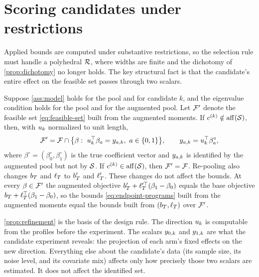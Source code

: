 \section{Scoring candidates under restrictions}
\label{sec:selection}

Applied bounds are computed under substantive restrictions, so the selection rule must handle a polyhedral $\mathcal R$, where widths
are finite and the dichotomy of \cref{prop:dichotomy} no longer holds. The
key structural fact is that the candidate's entire effect on the
feasible set passes through two scalars.

\begin{proposition}
\label{prop:refinement}
Suppose \cref{ass:model} holds for the pool and for candidate $k$, and
the eigenvalue condition holds for the pool and for the augmented pool. Let
$\mathcal F'$ denote the feasible set \eqref{eq:feasible-set} built from
the augmented moments. If $c^{(k)}\notin\operatorname{aff}(\mathcal S)$, then, with
$u_{k}$ normalized to unit length,
\begin{equation}
  \feasset'
  =\feasset\cap
  \bigl\{\beta:\ \newdir{k}^\top\beta_a=\reveal{a}{k},\ a\in\{0,1\}\bigr\},
  \qquad
  \reveal{a}{k}=\newdir{k}^\top\beta_a^\circ,
  \label{eq:refinement}
\end{equation}
where $\beta^\circ=(\beta_0^\circ,\beta_1^\circ)$ is the true
coefficient vector and $y_{a,k}$ is identified by the augmented
pool but not by $\mathcal S$. If $c^{(k)}\in\operatorname{aff}(\mathcal S)$, then
$\mathcal F'=\mathcal F$. Re-pooling also changes $b_T$ and $\ell_T$ to
$b_T'$ and $\ell_T'$. These changes do not affect the bounds. At every
$\beta\in\mathcal F'$ the augmented objective
$b_T'+\ell_T'^\top(\beta_1-\beta_0)$ equals the base objective
$b_T+\ell_T^\top(\beta_1-\beta_0)$, so the bounds
\eqref{eq:endpoint-programs} built from the augmented moments equal the
bounds built from $(b_T,\ell_T)$ over $\mathcal F'$.
\end{proposition}

\cref{prop:refinement} is the basis of the design rule. The direction
$u_{k}$ is computable from the profiles before the experiment. The scalars
$y_{0,k}$ and $y_{1,k}$ are what the candidate experiment
reveals: the projection of each arm's fixed effects on the new
direction. Everything else about the candidate's data (its sample size, its noise
level, and its covariate mix) affects only how precisely those two
scalars are estimated. It does not affect the identified set.

